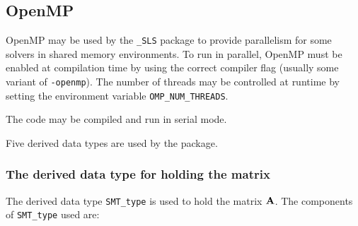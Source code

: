 \documentclass{galahad}
\newcommand{\packagename}{SLS}
\newcommand{\fullpackagename}{\libraryname\_\-\packagename}
\begin{document}

\subsection{OpenMP}
OpenMP may be used by the {\tt \fullpackagename} package to provide
parallelism for some solvers in shared memory environments.
To run in parallel, OpenMP
must be enabled at compilation time by using the correct compiler flag
(usually some variant of {\tt -openmp}).
The number of threads may be controlled at runtime
by setting the environment variable {\tt OMP\_NUM\_THREADS}.

\noindent
The code may be compiled and run in serial mode.



\galtypes
Five derived data types are used by the package.


\subsubsection{The derived data type for holding the matrix}\label{typeprob}
The derived data type {\tt SMT\_type} is used to hold the matrix ${\mathbf{A}}$.
The components of {\tt SMT\_type} used are:
\end{document}
